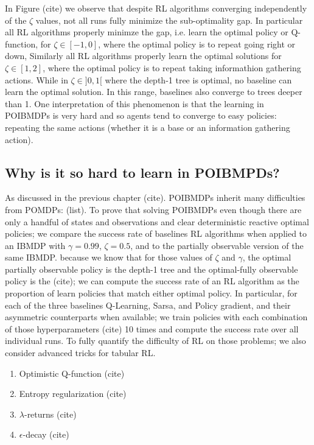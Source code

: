 In Figure (cite) we observe that despite RL algorithms converging independently of the $\zeta$ values, not all runs fully minimize the sub-optimality gap.
In particular all RL algorithms properly minimze the gap, i.e. learn the optimal policy or Q-function, for $\zeta \in [-1, 0]$, where the optimal policy is to repeat going right or down,
Similarly all RL algorithms properly learn the optimal solutions for $\zeta \in [1, 2]$, where the optimal policy is to repeat taking informathion gathering actions. 
While in $\zeta \in ]0, 1[$ where the depth-1 tree is optimal, no baseline can learn the optimal solution. 
In this range, baselines also converge to trees deeper than 1.
One interpretation of this phenomenon is that the learning in POIBMDPs is very hard and so agents tend to converge to easy policies: repeating the same actions (whether it is a base or an information gathering action). 


\subsection{Why is it so hard to learn in POIBMPDs?}

As discussed in the previous chapter (cite). POIBMDPs inherit many difficulties from POMDPs: (list).
To prove that solving POIBMDPs even though there are only a handful of states and observations and clear deterministic reactive optimal policies; we compare the success rate of baselines RL algorithms when applied to an IBMDP with $\gamma=0.99$, $\zeta=0.5$, and to the partially observable version of the same IBMDP.
because we know that for those values of $\zeta$ and $\gamma$, the optimal partially observable policy is the depth-1 tree and the optimal-fully observable policy is the (cite); we can compute the success rate of an RL algorithm as the proportion of learn policies that match either optimal policy.
In particular, for each of the three baselines Q-Learning, Sarsa, and Policy gradient, and their asymmetric counterparts when available; we train policies with each combination of those hyperparameters (cite) 10 times and compute the success rate over all individual runs.
To fully quantify the difficulty of RL on those problems; we also consider advanced tricks for tabular RL.
\begin{enumerate}
    \item Optimistic Q-function (cite)
    \item Entropy regularization (cite)
    \item $\lambda$-returns (cite)
    \item $\epsilon$-decay (cite)
\end{enumerate}

